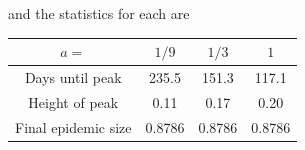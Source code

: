 \documentclass{article}
\begin{document}
\begin{figure}[H]
        \centering
\end{figure}
and the statistics for each are
\begin{center}
        \begin{tabular}{|c|c|c|c|}
                \hline
		$a=$ & $1/9$ & $1/3$ & $1$ \\
                \hline
		Days until peak & 235.5 & 151.3 & 117.1 \\
		Height of peak & 0.11 & 0.17 & 0.20 \\
		Final epidemic size & 0.8786 & 0.8786 & 0.8786 \\
		\hline
	\end{tabular}
\end{center}
\end{document}
